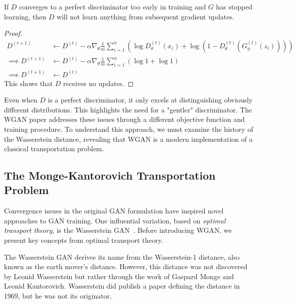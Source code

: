 \begin{theorem}%
	\label{thm:too-early}
	If $D$ converges to a perfect discriminator too early in training and $G$
	has stopped learning, then $D$ will not learn anything from subsequent gradient
	updates.
\end{theorem}

\begin{proof}
	\begin{align}
		\label{eq:d-updates-no-good}
		D^{(t+1)}          & \gets D^{(t)} - \alpha \nabla_\theta \frac{1}{m}
		\sum_{i=1}^n \left( \log D^{(t)}_\theta(x_i)
		+ \log(1 - D^{(t)}_\theta(G^{(t)}_\phi(z_i))) \right)                                                            \\
		\implies D^{(t+1)} & \gets D^{(t)} - \alpha\nabla_\theta \frac{1}{m} \sum_{i=1}^n \left( \log 1 + \log 1 \right) \\
		\implies D^{(t+1)} & \gets D^{(t)}
	\end{align}
	This shows that $D$ receives no updates.
\end{proof}

Even when $D$ is a perfect discriminator, it only excels at distinguishing obviously different distributions. This highlights the need for a "gentler" discriminator. The WGAN paper addresses these issues through a different objective function and training procedure. To understand this approach, we must examine the history of the Wasserstein distance, revealing that WGAN is a modern implementation of a classical transportation problem.

\subsection{The Monge-Kantorovich Transportation Problem}

Convergence issues in the original GAN formulation have inspired novel approaches to GAN training. One influential variation, based on \textit{optimal transport theory}, is the Wasserstein GAN~\cite{ref:arjovsky-2017}. Before introducing WGAN, we present key concepts from optimal transport theory.

The Wasserstein GAN derives its name from the Wasserstein-1 distance, also known as the earth mover's distance. However, this distance was not discovered by Leonid Wasserstein but rather through the work of Gaspard Monge and Leonid Kantorovich. Wasserstein did publish a paper defining the distance in 1969, but he was not its originator.

